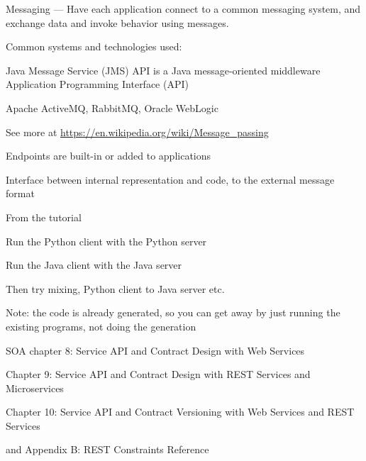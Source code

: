 \documentclass[Screen16to9,17pt]{foils}
\begin{document}


Messaging — Have each application connect to a common messaging system, and exchange data and invoke behavior using messages.

Common systems and technologies used:
\begin{list2}
\item Java Message Service (JMS) API is a Java message-oriented middleware Application Programming Interface (API)
\item Apache ActiveMQ, RabbitMQ, Oracle WebLogic
\item See more at \url{https://en.wikipedia.org/wiki/Message_passing}
\end{list2}





\begin{list2}
\item Endpoints are built-in or added to applications
\item Interface between internal representation and code, to the external message format
\end{list2}



\begin{list2}
\item From the tutorial 
\item Run the Python client with the Python server
\item Run the Java client with the Java server
\item Then try mixing, Python client to Java server etc.
\item Note: the code is already generated, so you can get away by just running the existing programs, not doing the generation
\end{list2}



\begin{list1}
\item SOA chapter 8: Service API and Contract Design
with Web Services
\item Chapter 9: Service API and Contract Design with
REST Services and Microservices
\item Chapter 10: Service API and Contract Versioning
with Web Services and REST Services
\item and Appendix B: REST Constraints Reference
\end{list1}
\end{document}
